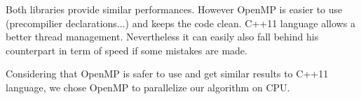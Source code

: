 Both libraries provide similar performances\cite{OpenMP_vs_CC}. However OpenMP is easier to use (precompilier declarations...) and keeps the code clean\cite{OpenMp_vs_explicit_threading}. C++11 language allows a better thread management. Nevertheless it can easily also fall behind his counterpart in term of speed if some mistakes are made.

Considering that OpenMP is safer to use and get similar results to C++11 language, we chose OpenMP to parallelize our algorithm on CPU.